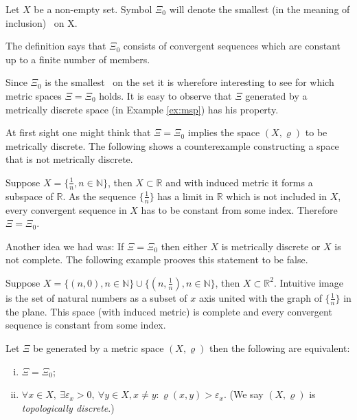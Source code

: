 \begin{define}\label{def:xi0}
Let $X$ be a non-empty set. Symbol $\Xi_0$ will denote the smallest (in the meaning of inclusion) \fcs\ on X.
\end{define}

The definition says that $\Xi_0$ consists of convergent sequences which are constant up to a finite number of members.

Since $\Xi_0$ is the smallest \fcs\ on the set it is wherefore interesting to see for which metric spaces $\Xi=\Xi_0$ holds. It is easy to observe that $\Xi$ generated by a metrically discrete space (in Example \ref{ex:msp}) has his property.


At first sight one might think that  $\Xi=\Xi_0$ implies the space $(X,\varrho)$ to be metrically discrete. The following shows a counterexample constructing a space that is not metrically discrete.
\begin{example}
	Suppose $X=\{\frac{1}{n}, n\in \mathbb{N}\}$, then $X\subset \mathbb{R}$ and with induced metric it forms a subspace of $\mathbb{R}$. As the sequence $\{\frac{1}{n}\}$ has a limit in $\mathbb{R}$ which is not included in $X$, every convergent sequence in $X$ has to be constant from some index. Therefore $\Xi=\Xi_0$.
\end{example}

Another idea we had was: If $\Xi=\Xi_0$ then either $X$ is metrically discrete or $X$ is not complete. The following example prooves this statement to be false.

\begin{example}
	Suppose $X=\{(n,0), n\in \mathbb{N}\}\cup\{(n,\frac{1}{n}), n\in \mathbb{N}\}$, then $X\subset \mathbb{R}^2$. Intuitive image is the set of natural numbers as a subset of $x$ axis united with the graph of $\{\frac{1}{n}\}$ in the plane. This space (with induced metric) is complete and every convergent sequence is constant from some index.
\end{example}


\begin{theorem} \label{th:genxi0}
Let $\Xi$ be generated by a metric space $(X,\varrho)$ then the following are equivalent:
\begin{enumerate}[(i)]
	\item $\Xi=\Xi_0$;
	\item $\forall x\in X,\ \exists \varepsilon_x>0,\ \forall y\in X, x\neq y: \varrho(x,y)>\varepsilon_x$. (We say $(X,\varrho)$ is \emph{topologically discrete}.)
\end{enumerate}
\end{theorem} 

